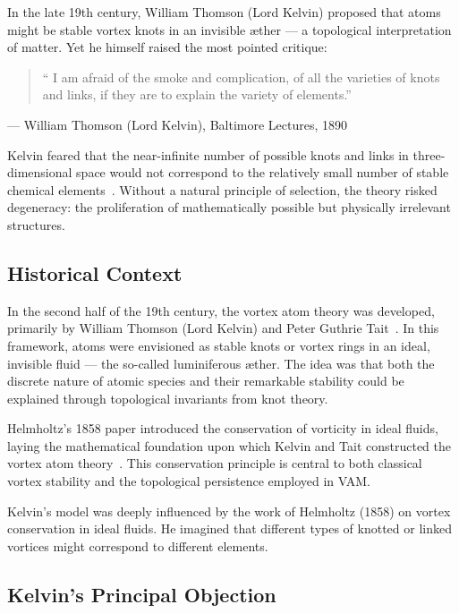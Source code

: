    In the late 19th century, William Thomson (Lord Kelvin) proposed that atoms might be stable vortex knots in an invisible æther — a topological interpretation of matter. Yet he himself raised the most pointed critique:

   \begin{quote}
   `` I am afraid of the smoke and complication, of all the varieties of knots and links, if they are to explain the variety of elements.''
   \end{quote}
   \begin{flushright}
     — William Thomson (Lord Kelvin), Baltimore Lectures, 1890
   \end{flushright}

   Kelvin feared that the near-infinite number of possible knots and links in three-dimensional space would not correspond to the relatively small number of stable chemical elements~\cite{thomson1890knots, tait1877knots}. Without a natural principle of selection, the theory risked degeneracy: the proliferation of mathematically possible but physically irrelevant structures.

   \subsection*{Historical Context}

   In the second half of the 19th century, the vortex atom theory was developed, primarily by William Thomson (Lord Kelvin) and Peter Guthrie Tait~\cite{thomson1890knots, tait1877knots}. In this framework, atoms were envisioned as stable knots or vortex rings in an ideal, invisible fluid — the so-called luminiferous æther. The idea was that both the discrete nature of atomic species and their remarkable stability could be explained through topological invariants from knot theory.

   Helmholtz's 1858 paper introduced the conservation of vorticity in ideal fluids, laying the mathematical foundation upon which Kelvin and Tait constructed the vortex atom theory~\cite{helmholtz1858vortices}. This conservation principle is central to both classical vortex stability and the topological persistence employed in VAM.

   Kelvin's model was deeply influenced by the work of Helmholtz (1858) on vortex conservation in ideal fluids. He imagined that different types of knotted or linked vortices might correspond to different elements.

   \subsection*{Kelvin's Principal Objection}

